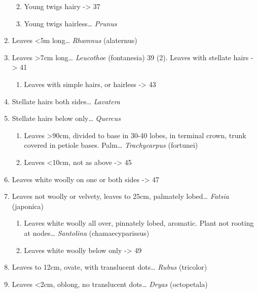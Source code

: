 \documentclass[openany]{book}
\providecommand{\tightlist}{%
  \setlength{\itemsep}{0pt}\setlength{\parskip}{0pt}}
\begin{document}
\begin{enumerate}
  \begin{enumerate}
  \def\labelenumii{\arabic{enumii}.}
  \setcounter{enumii}{34}
  \tightlist
  \item
    Young twigs hairy -\textgreater{} 37
  \item
    Young twigs hairless\ldots{} \emph{Prunus}
  \end{enumerate}
\item
  Leaves \textless{}5m long\ldots{} \emph{Rhamnus} (alaternus)
\item
  Leaves \textgreater{}7cm long\ldots{} \emph{Leucothoe} (fontanesia) 39
  (2). Leaves with stellate hairs -\textgreater{} 41

  \begin{enumerate}
  \def\labelenumii{\arabic{enumii}.}
  \setcounter{enumii}{39}
  \tightlist
  \item
    Leaves with simple hairs, or hairless -\textgreater{} 43
  \end{enumerate}
\item
  Stellate hairs both sides\ldots{} \emph{Lavatera}
\item
  Stellate hairs below only\ldots{} \emph{Quercus}

  \begin{enumerate}
  \def\labelenumii{\arabic{enumii}.}
  \setcounter{enumii}{42}
  \tightlist
  \item
    Leaves \textgreater{}90cm, divided to base in 30-40 lobes, in
    terminal crown, trunk covered in petiole bases. Palm\ldots{}
    \emph{Trachycarpus} (fortunei)
  \item
    Leaves \textless{}10cm, not as above -\textgreater{} 45
  \end{enumerate}
\item
  Leaves white woolly on one or both sides -\textgreater{} 47
\item
  Leaves not woolly or velvety, leaves to 25cm, palmately lobed\ldots{}
  \emph{Fatsia} (japonica)

  \begin{enumerate}
  \def\labelenumii{\arabic{enumii}.}
  \setcounter{enumii}{46}
  \tightlist
  \item
    Leaves white woolly all over, pinnately lobed, aromatic. Plant not
    rooting at nodes\ldots{} \emph{Santolina} (chamaecyparissus)
  \item
    Leaves white woolly below only -\textgreater{} 49
  \end{enumerate}
\item
  Leaves to 12cm, ovate, with translucent dots\ldots{} \emph{Rubus}
  (tricolor)
\item
  Leaves \textless{}2cm, oblong, no translucent dots\ldots{}
  \emph{Dryas} (octopetala)
\end{enumerate}
\end{document}

